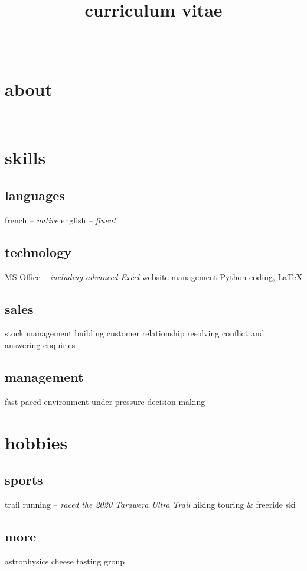 \documentclass[a4paper]{farangoth-cv}
\newcommand*{\cvTitle}{curriculum vitae}
\begin{document}
\title{\cvTitle}
\author{\myFirstName\ \myLastName}

\makeheader{}

\begin{aside}
  \section{about}\label{sec:about}
  \href{mailto:\myMail}{\myMail}
  \href{tel:\myPhoneNumber}{\myPhoneNumber}
  ~
  \myAddress{}

  \section{skills}
  \subsection{languages}
  french \--- \emph{native}
  english \--- \emph{fluent}

  \subsection{technology}
  MS Office \---  \emph{including advanced Excel}
  website management
  Python coding, \LaTeX%
  
  \subsection{sales}
  stock management
  building customer relationship
  resolving conflict and answering enquiries

  \subsection{management}
  fast-paced environment
  under pressure decision making
    
  \section{hobbies}
  \subsection{sports}
  trail running \--- \emph{raced the 2020 Tarawera Ultra Trail}
  hiking
  touring \& freeride ski

  \subsection{more}
  astrophysics
  cheese tasting group
\end{aside}
\end{document}
